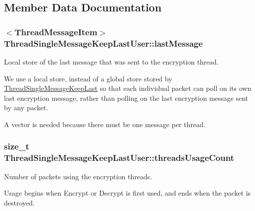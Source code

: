 \subsection{Member Data Documentation}
\hypertarget{class_thread_single_message_keep_last_user_af278a99dd5a8994473021886b7ebf963}{
\subsubsection[{lastMessage}]{$<${\bf ThreadMessageItem}$>$ {\bf ThreadSingleMessageKeepLastUser::lastMessage}}}
\label{class_thread_single_message_keep_last_user_af278a99dd5a8994473021886b7ebf963}


Local store of the last message that was sent to the encryption thread. 

We use a local store, instead of a global store stored by \hyperlink{class_thread_single_message_keep_last}{ThreadSingleMessageKeepLast} so that each individual packet can poll on its own last encryption message, rather than polling on the last encryption message sent by any packet. \par
\par


A vector is needed because there must be one message per thread. \hypertarget{class_thread_single_message_keep_last_user_a04ab8e3b67f4a9b995e2432e1462ce12}{
\subsubsection[{threadsUsageCount}]{\setlength{\rightskip}{0pt plus 5cm}size\_\-t {\bf ThreadSingleMessageKeepLastUser::threadsUsageCount}}}
\label{class_thread_single_message_keep_last_user_a04ab8e3b67f4a9b995e2432e1462ce12}


Number of packets using the encryption threads. 

Usage begins when Encrypt or Decrypt is first used, and ends when the packet is destroyed. \par
\par


